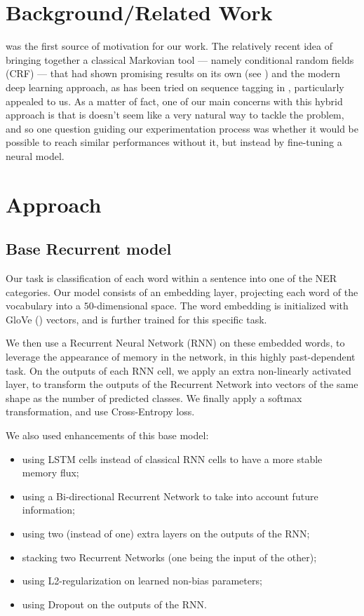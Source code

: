 \documentclass{article} %
\begin{document}
\section{Background/Related Work}

\cite{lample2016neural} was the first source of motivation for our work. The relatively recent idea of bringing together a classical Markovian tool --- namely conditional random fields (CRF) --- that had shown promising results on its own (see \cite{mccallum2003early}) and the modern deep learning approach, as has been tried on sequence tagging in \cite{huang2015bidirectional}, particularly appealed to us. As a matter of fact, one of our main concerns with this hybrid approach is that is doesn't seem like a very natural way to tackle the problem, and so one question guiding our experimentation process was whether it would be possible to reach similar performances without it, but instead by fine-tuning a neural model.




\section{Approach}

\subsection{Base Recurrent model}

Our task is classification of each word within a sentence into one of
the NER categories. Our model consists of an embedding layer, projecting
each word of the vocabulary into a $50$-dimensional space. The word
embedding is initialized with GloVe (\cite{pennington2014glove}) vectors, and is further trained for this specific
task.

We then use a Recurrent Neural Network (RNN) on these embedded words, to
leverage the appearance of memory in the network, in this highly
past-dependent task. On the outputs of each RNN cell, we apply an extra
non-linearly activated layer, to transform the outputs of the Recurrent
Network into vectors of the same shape as the number of predicted
classes. We finally apply a softmax transformation, and use
Cross-Entropy loss.

We also used enhancements of this base model:

\begin{itemize}
\itemsep1pt\parskip0pt
\item
  using LSTM cells instead of classical RNN cells to have a more stable
  memory flux;
\item
  using a Bi-directional Recurrent Network to take into account future
  information;
\item
  using two (instead of one) extra layers on the outputs of the RNN;
\item
  stacking two Recurrent Networks (one being the input of the other);
\item
  using L2-regularization on learned non-bias parameters;
\item
  using Dropout on the outputs of the RNN.
\end{itemize}
\end{document}
